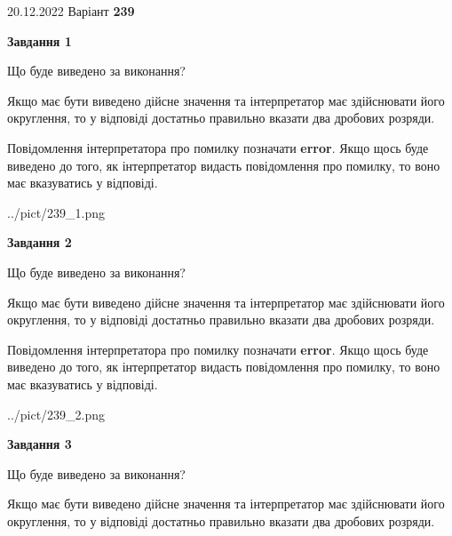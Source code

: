 \documentclass[12pt, ukrainian]{article}
\begin{document}
{20.12.2022 Варіант \No \textbf { 239 }\par}
{
\begin {Large}

{\begin {center}\textbf{Завдання 1}\end {center}}\par
Що буде виведено за виконання? \par

Якщо має бути виведено дійсне значення та інтерпретатор має здійснювати його округлення, 
то у відповіді достатньо правильно вказати два дробових розряди.

Повідомлення інтерпретатора про помилку позначати \textbf{error}.
Якщо щось буде виведено до того, як інтерпретатор видасть повідомлення про помилку, 
то воно має вказуватись у відповіді. \par

\begin{center}
	{../pict/239_1.png}
\end{center}
\newpage

{\begin {center}\textbf{Завдання 2}\end {center}}\par
Що буде виведено за виконання? \par

Якщо має бути виведено дійсне значення та інтерпретатор має здійснювати його округлення, 
то у відповіді достатньо правильно вказати два дробових розряди.

Повідомлення інтерпретатора про помилку позначати \textbf{error}.
Якщо щось буде виведено до того, як інтерпретатор видасть повідомлення про помилку, 
то воно має вказуватись у відповіді. \par

\begin{center}
	{../pict/239_2.png}
\end{center}
\newpage

{\begin {center}\textbf{Завдання 3}\end {center}}\par
Що буде виведено за виконання? \par

Якщо має бути виведено дійсне значення та інтерпретатор має здійснювати його округлення, 
то у відповіді достатньо правильно вказати два дробових розряди.


\end{Large}}
\end{document}
